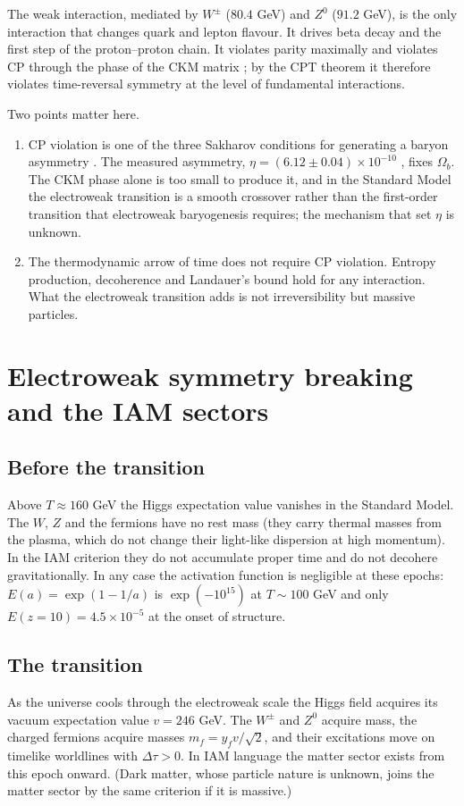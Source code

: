 \documentclass[12pt,a4paper]{article}
\begin{document}
The weak interaction, mediated by $W^\pm$ ($80.4$ GeV) and $Z^0$ ($91.2$ GeV), is
the only interaction that changes quark and lepton flavour. It drives beta decay
and the first step of the proton--proton chain. It violates parity maximally
\citep{wu1957} and violates CP through the phase of the CKM matrix
\citep{cronin1964,ckm1973}; by the CPT theorem it therefore violates time-reversal
symmetry at the level of fundamental interactions.

Two points matter here.
\begin{enumerate}
  \item CP violation is one of the three Sakharov conditions for generating a
  baryon asymmetry \citep{sakharov1967}. The measured asymmetry,
  $\eta=(6.12\pm0.04)\times10^{-10}$ \citep{planck2020}, fixes $\Omega_b$. The CKM
  phase alone is too small to produce it, and in the Standard Model the electroweak
  transition is a smooth crossover rather than the first-order transition that
  electroweak baryogenesis requires; the mechanism that set $\eta$ is unknown.
  \item The thermodynamic arrow of time does not require CP violation. Entropy
  production, decoherence and Landauer's bound hold for any interaction. What the
  electroweak transition adds is not irreversibility but massive particles.
\end{enumerate}

\section{Electroweak symmetry breaking and the IAM sectors}
\label{sec:ewsb}

\subsection{Before the transition}
Above $T\approx160$ GeV the Higgs expectation value vanishes in the Standard Model.
The $W$, $Z$ and the fermions have no rest mass (they carry thermal masses from the
plasma, which do not change their light-like dispersion at high momentum). In the
IAM criterion they do not accumulate proper time and do not decohere
gravitationally. In any case the activation function is negligible at these epochs:
$E(a)=\exp(1-1/a)$ is $\exp(-10^{15})$ at $T\sim100$ GeV and only
$E(z=10)=4.5\times10^{-5}$ at the onset of structure.

\subsection{The transition}
As the universe cools through the electroweak scale the Higgs field acquires its
vacuum expectation value $v=246$ GeV. The $W^\pm$ and $Z^0$ acquire mass, the
charged fermions acquire masses $m_f=y_f v/\sqrt2$, and their excitations move on
timelike worldlines with $\Delta\tau>0$. In IAM language the matter sector exists
from this epoch onward. (Dark matter, whose particle nature is unknown, joins the
matter sector by the same criterion if it is massive.)
\end{document}
